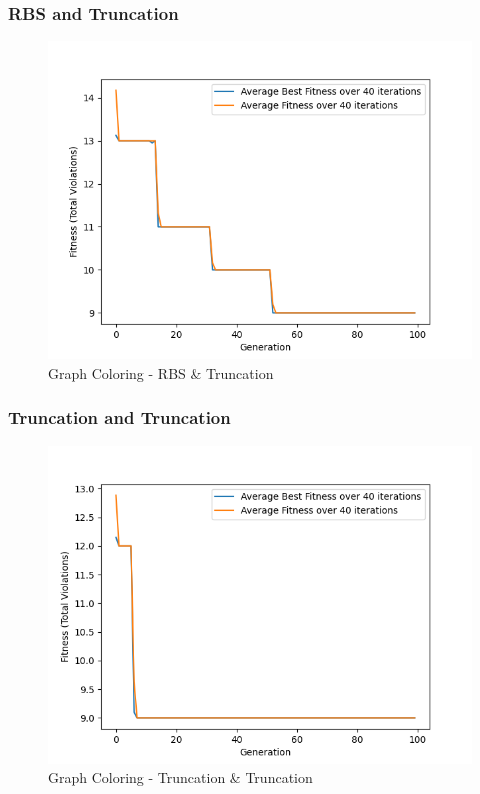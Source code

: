\documentclass[11pt, letterpaper]{article}
\begin{document}
\subsubsection {RBS and Truncation}
\begin{figure}[h]
    \centering
    \includegraphics[scale = 0.6]{images/graphcoloring_rb_tr.png}
    \caption {Graph Coloring - RBS \& Truncation}
    \label {fig:gcBT}
\end{figure}

\subsubsection {Truncation and Truncation}
\begin{figure}[H]
    \centering
    \includegraphics[scale = 0.6]{images/graphcoloring_tr_tr.png}
    \caption {Graph Coloring - Truncation \& Truncation}
    \label {fig:gcTT}
\end{figure}
\end{document}
